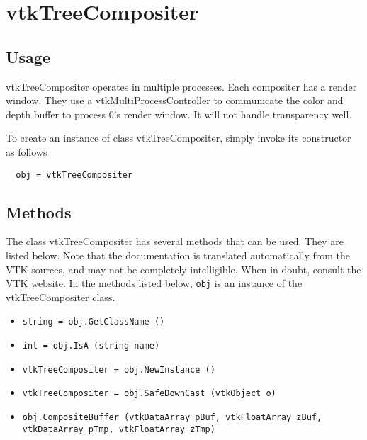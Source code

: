 \section{vtkTreeCompositer}

\subsection{Usage}

 vtkTreeCompositer operates in multiple processes.  Each compositer has 
 a render window.  They use a vtkMultiProcessController to communicate 
 the color and depth buffer to process 0's render window.
 It will not handle transparency well.


To create an instance of class vtkTreeCompositer, simply
invoke its constructor as follows
\begin{verbatim}
  obj = vtkTreeCompositer
\end{verbatim}
\subsection{Methods}

The class vtkTreeCompositer has several methods that can be used.
  They are listed below.
Note that the documentation is translated automatically from the VTK sources,
and may not be completely intelligible.  When in doubt, consult the VTK website.
In the methods listed below, \verb|obj| is an instance of the vtkTreeCompositer class.
\begin{itemize}
\item  \verb|string = obj.GetClassName ()|

\item  \verb|int = obj.IsA (string name)|

\item  \verb|vtkTreeCompositer = obj.NewInstance ()|

\item  \verb|vtkTreeCompositer = obj.SafeDownCast (vtkObject o)|

\item  \verb|obj.CompositeBuffer (vtkDataArray pBuf, vtkFloatArray zBuf, vtkDataArray pTmp, vtkFloatArray zTmp)|

\end{itemize}
